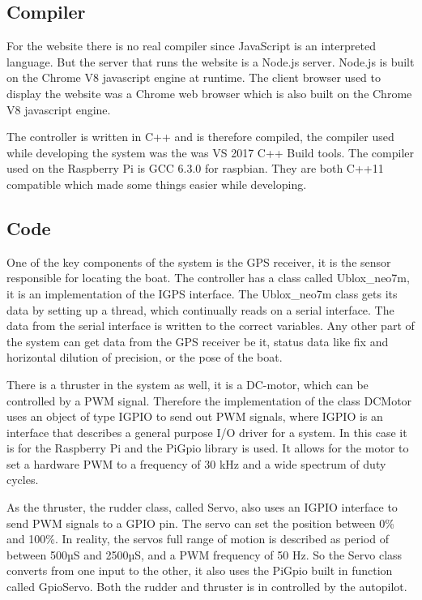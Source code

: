 \subsection{Compiler}
For the website there is no real compiler since JavaScript is an interpreted language. But the server that runs the website is a Node.js server. Node.js is built on the Chrome V8 javascript engine at runtime. The client browser used to display the website was a Chrome web browser which is also built on the Chrome V8 javascript engine. 

The controller is written in C++ and is therefore compiled, the compiler used while developing the system was the was VS 2017 C++ Build tools\cite{VC-2017}. The compiler used on the Raspberry Pi is GCC 6.3.0 for raspbian\cite{GCC}. They are both C++11 compatible which made some things easier while developing. 

\subsection{Code}

One of the key components of the system is the GPS receiver, it is the sensor responsible for locating the boat. The controller has a class called Ublox\_neo7m, it is an implementation of the IGPS interface. The Ublox\_neo7m class gets its data by setting up a thread, which continually reads on a serial interface. The data from the serial interface is written to the correct variables. Any other part of the system can get data from the GPS receiver be it, status data like fix and horizontal dilution of precision, or the pose of the boat. 

There is a thruster in the system as well, it is a DC-motor, which can be controlled by a PWM signal. Therefore the implementation of the class DCMotor uses an object of type IGPIO to send out PWM signals, where IGPIO is an interface that describes a general purpose I/O driver for a system. In this case it is for the Raspberry Pi and the PiGpio library is used\cite{pigpio}. It allows for the motor to set a hardware PWM to a frequency of 30 kHz and a wide spectrum of duty cycles.

As the thruster, the rudder class, called Servo, also uses an IGPIO interface to send PWM signals to a GPIO pin. The servo can set the position between 0\% and 100\%. In reality, the servos full range of motion is described as period of between 500µS and 2500µS, and a PWM frequency of 50 Hz. So the Servo class converts from one input to the other, it also uses the PiGpio built in function called GpioServo. Both the rudder and thruster is in controlled by the autopilot.

